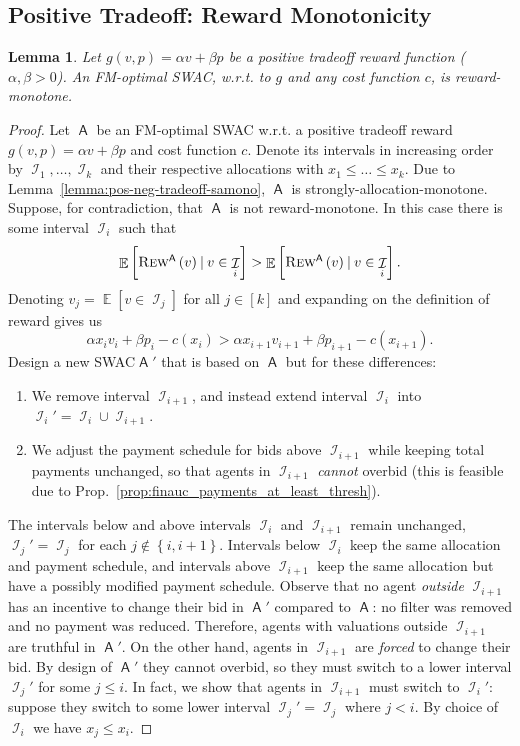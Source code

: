 \documentclass[11pt,letterpaper]{article}
\newcommand{\set}[1]{\left\{#1\right\}}
\newcommand{\sqbr}[1]{\left[ #1 \right]}
\newcommand{\samono}{strongly-allocation-monotone\xspace}
\newcommand{\rmono}{reward-monotone\xspace}
\newcommand{\swac}{SWAC\xspace}
\DeclareMathOperator*{\E}{\bb{E}}
\newcommand{\given}{\medspace | \medspace}
\newcommand{\bb}[1]{\mathbb{#1}}
\DeclareMathOperator{\A}{\auc{A}}
\DeclareMathOperator{\I}{\mathcal{I}}
\newcommand{\g}{g}
\theoremstyle{plain}
\newtheorem{lemma}[theorem]{Lemma}
\newcommand{\auc}[1]{\mathsf{#1}}
\begin{document}
\subsection{Positive Tradeoff: Reward Monotonicity}
\begin{lemma}\label{lemma:pos-tradeoff-rmono}
    Let $\g(v,p)=\alpha v+\beta p$ be a positive tradeoff reward function ($\alpha,\beta>0$). An FM-optimal \swac, w.r.t. to $\g$ and any cost function $c$, is \rmono.
\end{lemma}
\begin{proof}
    Let $\A$ be an FM-optimal \swac w.r.t. a positive tradeoff reward $\g(v,p)=\alpha v+\beta p$ and cost function $c$. Denote its intervals in increasing order by $\I_1,\dots,\I_k$ and their respective allocations with $x_1\leq\dots\leq x_k$. Due to Lemma~\ref{lemma:pos-neg-tradeoff-samono}, $\A$ is \samono. Suppose, for contradiction, that $\A$ is not \rmono. In this case there is some interval $\I_i$ such that
    \begin{equation}
        \E\sqbr{\trew[\A]{v}\given v\in\I_i}>\E\sqbr{\trew[\A]{v}\given v\in\I_i}.
    \end{equation}
    Denoting $v_j=\E\sqbr{v\in\I_j}$ for all $j\in[k]$ and expanding on the definition of reward gives us
    \begin{equation}\label{eq:pos-tradeoff-rmono}
        \alpha x_iv_i+\beta p_i-c(x_i)>\alpha x_{i+1} v_{i+1}+\beta p_{i+1}-c(x_{i+1}).
    \end{equation}
    Design a new \swac $\A'$ that is based on $\A$ but for these differences:
    \begin{enumerate}
        \item We remove interval $\I_{i+1}$,
        and instead extend interval $\I_i$ into $\I_i' = \I_i \cup \I_{i+1}$.
        \item We adjust the payment schedule for bids above $\I_{i+1}$ while keeping total payments unchanged, so that agents in $\I_{i+1}$ \emph{cannot} overbid (this is feasible due to Prop.~\ref{prop:finauc_payments_at_least_thresh}).
    \end{enumerate}
    The intervals below and above intervals $\I_i$ and $\I_{i+1}$ remain unchanged,
    $\I_j' = \I_j$ for each $j \notin \set{i, i+1}$.
    Intervals below $\I_i$ keep the same allocation and payment schedule, and intervals above $\I_{i+1}$ keep the same allocation but have a possibly modified payment schedule.
    Observe that no agent
\emph{outside} $\I_{i+1}$
has an incentive to change their bid in $\A'$ compared to $\A$:
no filter was removed and no payment was reduced.
Therefore, agents with valuations outside $\I_{i+1}$ are truthful in $\A'$.
On the other hand, agents in $\I_{i+1}$ are \emph{forced} to change their bid.
By design of $\A'$ they cannot overbid,
so they must switch to a lower interval $\I_j'$
for some $j \leq i$.
In fact, we show that agents in $\I_{i+1}$
must switch to $\I_i'$:
suppose they switch to some lower interval $\I_j' = \I_j$
where $j < i$.
By choice of $\I_i$ we have $x_j \leq x_i$. 


\end{proof}
\end{document}
